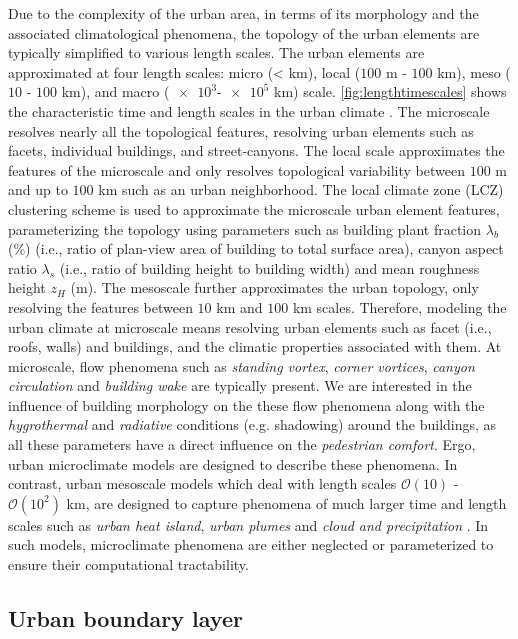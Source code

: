 Due to the complexity of the urban area, in terms of its morphology and the associated climatological phenomena, the topology of the urban elements are typically simplified to various length scales. The urban elements are approximated at four length scales: micro (< km), local ($100$ m - $100$ km), meso ($10$ - $100$ km), and macro ($\num{e3}$-$\num{e5}$ km) scale. \cref{fig:lengthtimescales} shows the characteristic time and length scales in the urban climate \citep{Oke2017a}. The microscale resolves nearly all the topological features, resolving urban elements such as facets, individual buildings, and street-canyons. The local scale approximates the features of the microscale and only resolves topological variability between $100$ m and up to $100$ km such as an urban neighborhood. The local climate zone (LCZ) clustering scheme is used to approximate the microscale urban element features, parameterizing the topology using parameters such as building plant fraction $\lambda_b$ (\%) (i.e., ratio of plan-view area of building to total surface area), canyon aspect ratio $\lambda_s$ (i.e., ratio of building height to building width) and mean roughness height $z_H$ (m). The mesoscale further approximates the urban topology, only resolving the features between $10$ km and $100$ km scales. Therefore, modeling the urban climate at microscale means resolving urban elements such as facet (i.e., roofs, walls) and buildings, and the climatic properties associated with them. At microscale, flow phenomena such as \textit{standing vortex}, \textit{corner vortices}, \textit{canyon circulation} and \textit{building wake} are typically present. We are interested in the influence of building morphology on the these flow phenomena along with the \textit{hygrothermal} and \textit{radiative} conditions (e.g. shadowing) around the buildings, as all these parameters have a direct influence on the \textit{pedestrian comfort}. Ergo, urban microclimate models are designed to describe these phenomena. In contrast, urban mesoscale  models which deal with length scales $\mathcal{O}(10)$ - $\mathcal{O}(10^2)$ km, are designed to capture phenomena of much larger time and length scales such as \textit{urban heat island}, \textit{urban plumes} and \textit{cloud and precipitation} \citep{Oke2017a}. In such models, microclimate phenomena are either neglected or parameterized to ensure their computational tractability.

\subsection{Urban boundary layer}

